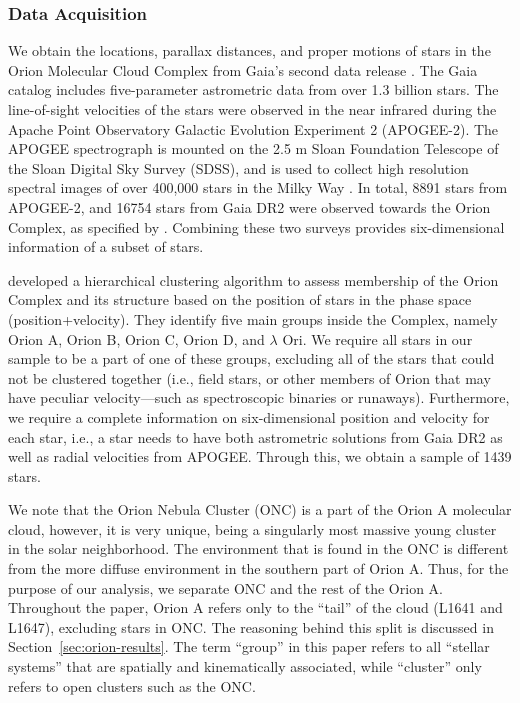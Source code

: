 \subsubsection{Data Acquisition}\label{sec:data1}
We obtain the locations, parallax distances, and proper motions of stars in the Orion Molecular Cloud Complex from Gaia's second data release \citep{gaia_collaboration_gaia_2018}. The Gaia catalog includes five-parameter astrometric data from over 1.3 billion stars. 
The line-of-sight velocities of the stars were observed in the near infrared during the Apache Point Observatory Galactic Evolution Experiment 2 (APOGEE-2). The APOGEE spectrograph is mounted on the 2.5 m Sloan Foundation Telescope of the Sloan Digital Sky Survey (SDSS), and is used to collect high resolution spectral images of over 400,000 stars in the Milky Way \citep{gunn_25_2006,blanton_sloan_2017}. 
In total, 8891 stars from APOGEE-2, and 16754 stars from Gaia DR2 were observed towards the Orion Complex, as specified by \citet{kounkel_apogee-2_2018}. Combining these two surveys provides six-dimensional information of a subset of stars.

\citet{kounkel_apogee-2_2018} developed a hierarchical clustering algorithm to assess membership of the Orion Complex and its structure based on the position of stars in the phase space (position+velocity). They identify five main groups inside the Complex, namely Orion A, Orion B, Orion C, Orion D, and $\lambda$ Ori. We require all stars in our sample to be a part of one of these groups, excluding all of the stars that could not be clustered together (i.e., field stars, or other members of Orion that may have peculiar velocity---such as spectroscopic binaries or runaways). Furthermore, we require a complete information on six-dimensional position and velocity for each star, i.e., a star needs to have both astrometric solutions from Gaia DR2 as well as radial velocities from APOGEE\@. Through this, we obtain a sample of 1439 stars.

We note that the Orion Nebula Cluster (ONC) is a part of the Orion A molecular cloud, however, it is very unique, being a singularly most massive young cluster in the solar neighborhood. The environment that is found in the ONC is different from the more diffuse environment in the southern part of Orion A. Thus, for the purpose of our analysis, we separate ONC and the rest of the Orion A. Throughout the paper, Orion A refers only to the ``tail'' of the cloud (L1641 and L1647), excluding stars in ONC\@. The reasoning behind this split is discussed in Section~\ref{sec:orion-results}. The term ``group'' in this paper refers to all ``stellar systems'' that are spatially and kinematically associated, while ``cluster'' only refers to open clusters such as the ONC.

